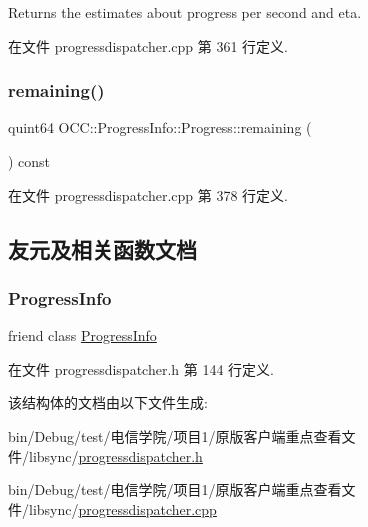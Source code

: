 Returns the estimates about progress per second and eta. 

在文件 progressdispatcher.\+cpp 第 361 行定义.

\mbox{\label{struct_o_c_c_1_1_progress_info_1_1_progress_af016f32a2745121bd670f4ccfe0634da}} 
\subsubsection{\texorpdfstring{remaining()}{remaining()}}
{\footnotesize\ttfamily quint64 O\+C\+C\+::\+Progress\+Info\+::\+Progress\+::remaining (\begin{DoxyParamCaption}{ }\end{DoxyParamCaption}) const}



在文件 progressdispatcher.\+cpp 第 378 行定义.



\subsection{友元及相关函数文档}
\mbox{\label{struct_o_c_c_1_1_progress_info_1_1_progress_a51d41a36b682a90c6cdabc1facdf78fa}} 
\subsubsection{\texorpdfstring{Progress\+Info}{ProgressInfo}}
{\footnotesize\ttfamily friend class \hyperlink{class_o_c_c_1_1_progress_info}{Progress\+Info}\hspace{0.3cm}{\ttfamily [friend]}}



在文件 progressdispatcher.\+h 第 144 行定义.



该结构体的文档由以下文件生成\+:\begin{DoxyCompactItemize}
\item 
bin/\+Debug/test/电信学院/项目1/原版客户端重点查看文件/libsync/\hyperlink{progressdispatcher_8h}{progressdispatcher.\+h}\item 
bin/\+Debug/test/电信学院/项目1/原版客户端重点查看文件/libsync/\hyperlink{progressdispatcher_8cpp}{progressdispatcher.\+cpp}\end{DoxyCompactItemize}
